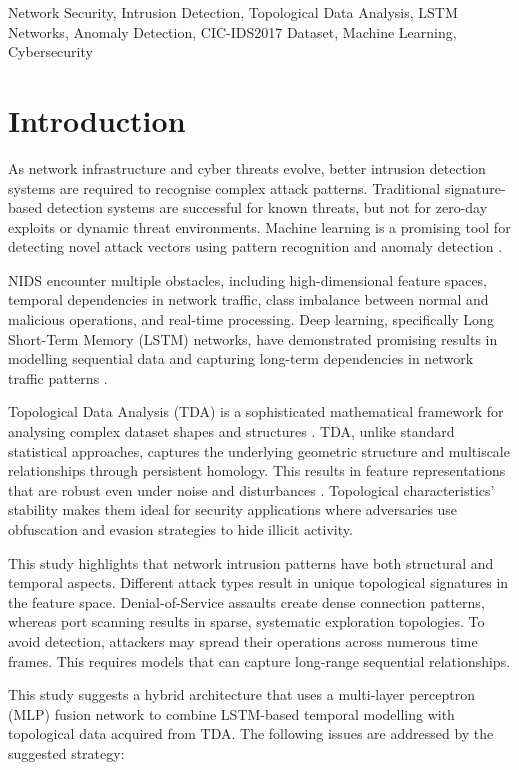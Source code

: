 \documentclass[conference]{IEEEtran}
\begin{document}
\begin{IEEEkeywords}
Network Security, Intrusion Detection, Topological Data Analysis, LSTM Networks, Anomaly Detection, CIC-IDS2017 Dataset, Machine Learning, Cybersecurity
\end{IEEEkeywords}

\section{Introduction}

As network infrastructure and cyber threats evolve, better intrusion detection systems are required to recognise complex attack patterns. Traditional signature-based detection systems are successful for known threats, but not for zero-day exploits or dynamic threat environments. Machine learning is a promising tool for detecting novel attack vectors using pattern recognition and anomaly detection \cite{ref26}.

NIDS encounter multiple obstacles, including high-dimensional feature spaces, temporal dependencies in network traffic, class imbalance between normal and malicious operations, and real-time processing. Deep learning, specifically Long Short-Term Memory (LSTM) networks, have demonstrated promising results in modelling sequential data and capturing long-term dependencies in network traffic patterns \cite{ref6, ref15}.

Topological Data Analysis (TDA) is a sophisticated mathematical framework for analysing complex dataset shapes and structures \cite{ref8}. TDA, unlike standard statistical approaches, captures the underlying geometric structure and multiscale relationships through persistent homology. This results in feature representations that are robust even under noise and disturbances \cite{ref20}. Topological characteristics' stability makes them ideal for security applications where adversaries use obfuscation and evasion strategies to hide illicit activity.

This study highlights that network intrusion patterns have both structural and temporal aspects. Different attack types result in unique topological signatures in the feature space. Denial-of-Service assaults create dense connection patterns, whereas port scanning results in sparse, systematic exploration topologies. To avoid detection, attackers may spread their operations across numerous time frames. This requires models that can capture long-range sequential relationships.

This study suggests a hybrid architecture that uses a multi-layer perceptron (MLP) fusion network to combine LSTM-based temporal modelling with topological data acquired from TDA. The following issues are addressed by the suggested strategy:
\end{document}
